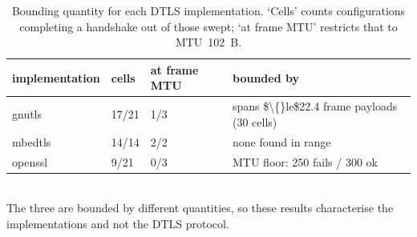 \begin{table}[t]
\centering
\caption{Bounding quantity for each DTLS implementation. `Cells' counts configurations completing a handshake out of those swept; `at frame MTU' restricts that to MTU~102~B.}
\label{tab:impls}
\footnotesize
\begin{tabular}{llll}
\hline
implementation & cells & at frame MTU & bounded by \\
\hline
gnutls & 17/21 & 1/3 & spans \$\textbackslash\{\}le\$22.4 frame payloads (30 cells) \\
mbedtls & 14/14 & 2/2 & none found in range \\
openssl & 9/21 & 0/3 & MTU floor: 250 fails / 300 ok \\
\hline
\end{tabular}
\\[2pt]{\footnotesize The three are bounded by different quantities, so these results characterise the implementations and not the DTLS protocol.}
\end{table}
